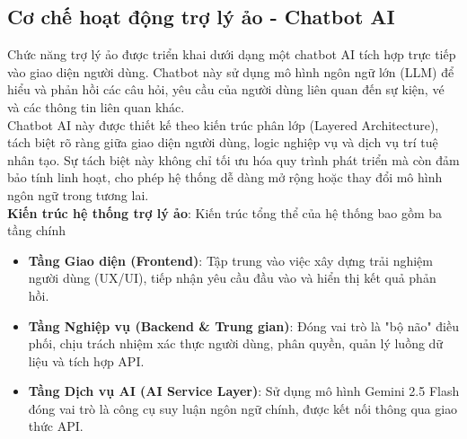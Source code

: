 \subsection{Cơ chế hoạt động trợ lý ảo - Chatbot AI}
\indent \indent Chức năng trợ lý ảo được triển khai dưới dạng một chatbot AI tích hợp trực tiếp vào giao diện người dùng. Chatbot này sử dụng mô hình ngôn ngữ lớn (LLM) để hiểu và phản hồi các câu hỏi, yêu cầu của người dùng liên quan đến sự kiện, vé và các thông tin liên quan khác.\\
\indent Chatbot AI này được thiết kế theo kiến trúc phân lớp (Layered Architecture), tách biệt rõ ràng giữa giao diện người dùng, logic nghiệp vụ và dịch vụ trí tuệ nhân tạo. 
Sự tách biệt này không chỉ tối ưu hóa quy trình phát triển mà còn đảm bảo tính linh hoạt, cho phép hệ thống dễ dàng mở rộng hoặc thay đổi mô hình ngôn ngữ trong tương lai.\\
\indent \textbf{Kiến trúc hệ thống trợ lý ảo}: Kiến trúc tổng thể của hệ thống bao gồm ba tầng chính
\begin{itemize}
    \item[1.] \textbf{Tầng Giao diện (Frontend)}: Tập trung vào việc xây dựng trải nghiệm người dùng (UX/UI), tiếp nhận yêu cầu đầu vào và hiển thị kết quả phản hồi.
    \item[2.] \textbf{Tầng Nghiệp vụ (Backend \& Trung gian)}: Đóng vai trò là "bộ não" điều phối, chịu trách nhiệm xác thực người dùng, phân quyền, quản lý luồng dữ liệu và tích hợp API.
    \item[3.] \textbf{Tầng Dịch vụ AI (AI Service Layer)}: Sử dụng mô hình Gemini 2.5 Flash đóng vai trò là công cụ suy luận ngôn ngữ chính, được kết nối thông qua giao thức API.
\end{itemize}

